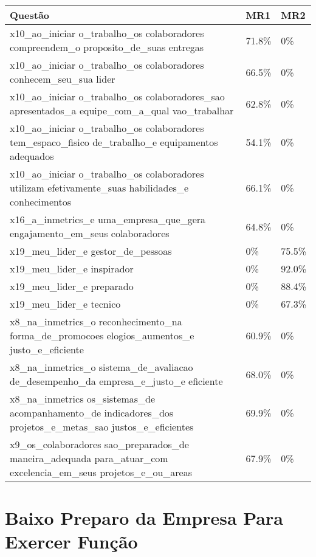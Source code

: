\documentclass[]{book}
\begin{document}
\begin{table}[H]
\centering\begingroup\fontsize{12}{14}\selectfont

\begin{tabular}{>{\raggedright\arraybackslash}p{20em}ll}
\toprule
Questão & MR1 & MR2\\
\midrule
x10\_ao\_iniciar
o\_trabalho\_os
colaboradores
compreendem\_o
proposito\_de\_suas
entregas & 71.8\% & 0\%\\
x10\_ao\_iniciar
o\_trabalho\_os
colaboradores
conhecem\_seu\_sua
lider & 66.5\% & 0\%\\
x10\_ao\_iniciar
o\_trabalho\_os
colaboradores\_sao
apresentados\_a
equipe\_com\_a\_qual
vao\_trabalhar & 62.8\% & 0\%\\
x10\_ao\_iniciar
o\_trabalho\_os
colaboradores
tem\_espaco\_fisico
de\_trabalho\_e
equipamentos
adequados & 54.1\% & 0\%\\
x10\_ao\_iniciar
o\_trabalho\_os
colaboradores
utilizam
efetivamente\_suas
habilidades\_e
conhecimentos & 66.1\% & 0\%\\
\addlinespace
x16\_a\_inmetrics\_e
uma\_empresa\_que\_gera
engajamento\_em\_seus
colaboradores & 64.8\% & 0\%\\
x19\_meu\_lider\_e
gestor\_de\_pessoas & 0\% & 75.5\%\\
x19\_meu\_lider\_e
inspirador & 0\% & 92.0\%\\
x19\_meu\_lider\_e
preparado & 0\% & 88.4\%\\
x19\_meu\_lider\_e
tecnico & 0\% & 67.3\%\\
\addlinespace
x8\_na\_inmetrics\_o
reconhecimento\_na
forma\_de\_promocoes
elogios\_aumentos\_e
justo\_e\_eficiente & 60.9\% & 0\%\\
x8\_na\_inmetrics\_o
sistema\_de\_avaliacao
de\_desempenho\_da
empresa\_e\_justo\_e
eficiente & 68.0\% & 0\%\\
x8\_na\_inmetrics
os\_sistemas\_de
acompanhamento\_de
indicadores\_dos
projetos\_e\_metas\_sao
justos\_e\_eficientes & 69.9\% & 0\%\\
x9\_os\_colaboradores
sao\_preparados\_de
maneira\_adequada
para\_atuar\_com
excelencia\_em\_seus
projetos\_e\_ou\_areas & 67.9\% & 0\%\\
\bottomrule
\end{tabular}
\endgroup{}
\end{table}

\hypertarget{baixo-preparo-da-empresa-para-exercer-funcao}{%
\section{Baixo Preparo da Empresa Para Exercer Função}\label{baixo-preparo-da-empresa-para-exercer-funcao}}
\end{document}
